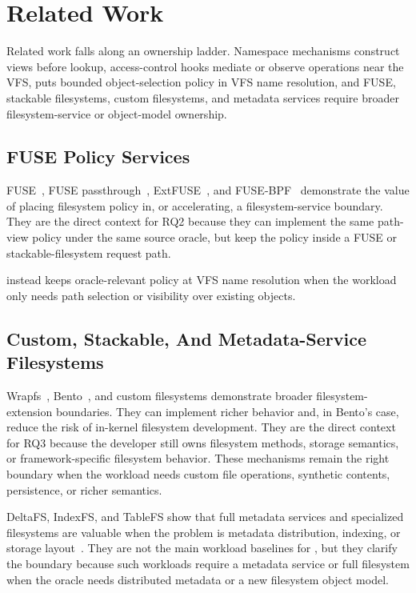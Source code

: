 \section{Related Work}
\label{sec:related-work}

Related work falls along an ownership ladder. Namespace mechanisms construct
views before lookup, access-control hooks mediate or observe operations near the
VFS, \namei puts bounded object-selection policy in VFS name resolution, and
FUSE, stackable filesystems, custom filesystems, and metadata services require
broader filesystem-service or object-model ownership.

\subsection{FUSE Policy Services}

FUSE~\cite{linux_fuse}, FUSE passthrough~\cite{linux_fuse_passthrough},
ExtFUSE~\cite{extfuse}, and FUSE-BPF~\cite{fuse_bpf_patch} demonstrate the
value of placing filesystem policy in, or accelerating, a filesystem-service
boundary. They are the direct context for RQ2 because they can implement the
same path-view policy under the same source oracle, but keep the policy inside a
FUSE or stackable-filesystem request path.

\namei instead keeps oracle-relevant policy at VFS name resolution when the
workload only needs path selection or visibility over existing objects.

\subsection{Custom, Stackable, And Metadata-Service Filesystems}

Wrapfs~\cite{wrapfs}, Bento~\cite{bento}, and custom filesystems demonstrate
broader filesystem-extension boundaries. They can implement richer behavior and,
in Bento's case, reduce the risk of in-kernel filesystem development. They are
the direct context for RQ3 because the developer still owns filesystem methods,
storage semantics, or framework-specific filesystem behavior. These mechanisms
remain the right boundary when the workload needs custom file operations,
synthetic contents, persistence, or richer semantics.

DeltaFS, IndexFS, and TableFS show that full metadata services and specialized
filesystems are valuable when the problem is metadata distribution, indexing,
or storage layout~\cite{deltafs_sc21,indexfs,tablefs}. They are not the main
workload baselines for \namei, but they clarify the boundary because such
workloads require a metadata service or full filesystem when the oracle needs
distributed metadata or a new filesystem object model.

